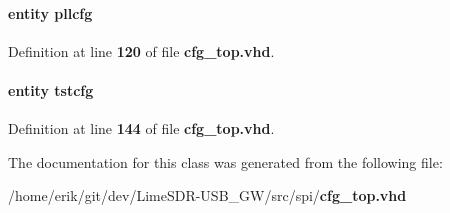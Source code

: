 \paragraph[{pllcfg\+\_\+inst1}]{ {\bfseries \textcolor{keywordflow}{entity}\textcolor{vhdlchar}{ }\textcolor{vhdlchar}{pllcfg}\textcolor{vhdlchar}{ }} \hspace{0.3cm}{\ttfamily [Instantiation]}}\label{classcfg__top_1_1arch_a49a103a7035005affc99f91cd8831aaf}


Definition at line {\bf 120} of file {\bf cfg\+\_\+top.\+vhd}.

\paragraph[{tstcfg\+\_\+inst3}]{ {\bfseries \textcolor{keywordflow}{entity}\textcolor{vhdlchar}{ }\textcolor{vhdlchar}{tstcfg}\textcolor{vhdlchar}{ }} \hspace{0.3cm}{\ttfamily [Instantiation]}}\label{classcfg__top_1_1arch_a1915cc6b01e3ba304b03fe02758ad408}


Definition at line {\bf 144} of file {\bf cfg\+\_\+top.\+vhd}.



The documentation for this class was generated from the following file\+:\begin{DoxyCompactItemize}
\item 
/home/erik/git/dev/\+Lime\+S\+D\+R-\/\+U\+S\+B\+\_\+\+G\+W/src/spi/{\bf cfg\+\_\+top.\+vhd}\end{DoxyCompactItemize}
